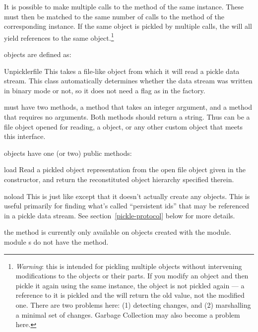 It is possible to make multiple calls to the  method of
the same  instance.  These must then be matched to the
same number of calls to the  method of the
corresponding  instance.  If the same object is
pickled by multiple  calls, the  will
all yield references to the same object.\footnote{\emph{Warning}: this
is intended for pickling multiple objects without intervening
modifications to the objects or their parts.  If you modify an object
and then pickle it again using the same  instance, the
object is not pickled again --- a reference to it is pickled and the
 will return the old value, not the modified one.
There are two problems here: (1) detecting changes, and (2)
marshalling a minimal set of changes.  Garbage Collection may also
become a problem here.}

 objects are defined as:

\begin{classdesc}{Unpickler}{file}
This takes a file-like object from which it will read a pickle data
stream.  This class automatically determines whether the data stream
was written in binary mode or not, so it does not need a flag as in
the  factory.

 must have two methods, a  method that takes
an integer argument, and a  method that requires no
arguments.  Both methods should return a string.  Thus  can
be a file object opened for reading, a
 object, or any other custom
object that meets this interface.
\end{classdesc}

 objects have one (or two) public methods:

\begin{methoddesc}[Unpickler]{load}{}
Read a pickled object representation from the open file object given
in the constructor, and return the reconstituted object hierarchy
specified therein.
\end{methoddesc}

\begin{methoddesc}[Unpickler]{noload}{}
This is just like  except that it doesn't actually
create any objects.  This is useful primarily for finding what's
called ``persistent ids'' that may be referenced in a pickle data
stream.  See section~\ref{pickle-protocol} below for more details.

 the  method is currently only
available on  objects created with the
 module.   module s do
not have the  method.
\end{methoddesc}

